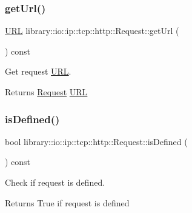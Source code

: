 \subsubsection{\texorpdfstring{get\+Url()}{getUrl()}}
{\footnotesize\ttfamily \hyperlink{classlibrary_1_1io_1_1_u_r_l}{U\+RL} library\+::io\+::ip\+::tcp\+::http\+::\+Request\+::get\+Url (\begin{DoxyParamCaption}{ }\end{DoxyParamCaption}) const}



Get request \hyperlink{classlibrary_1_1io_1_1_u_r_l}{U\+RL}. 

\begin{DoxyReturn}{Returns}
\hyperlink{classlibrary_1_1io_1_1ip_1_1tcp_1_1http_1_1_request}{Request} \hyperlink{classlibrary_1_1io_1_1_u_r_l}{U\+RL} 
\end{DoxyReturn}
\mbox{\label{classlibrary_1_1io_1_1ip_1_1tcp_1_1http_1_1_request_a66bbb39defc2952c2c3afb83f192e0e8}} 
\subsubsection{\texorpdfstring{is\+Defined()}{isDefined()}}
{\footnotesize\ttfamily bool library\+::io\+::ip\+::tcp\+::http\+::\+Request\+::is\+Defined (\begin{DoxyParamCaption}{ }\end{DoxyParamCaption}) const}



Check if request is defined. 

\begin{DoxyReturn}{Returns}
True if request is defined 
\end{DoxyReturn}
\mbox{\label{classlibrary_1_1io_1_1ip_1_1tcp_1_1http_1_1_request_a542d84054f8f60992eb71fad68663eac}} 
